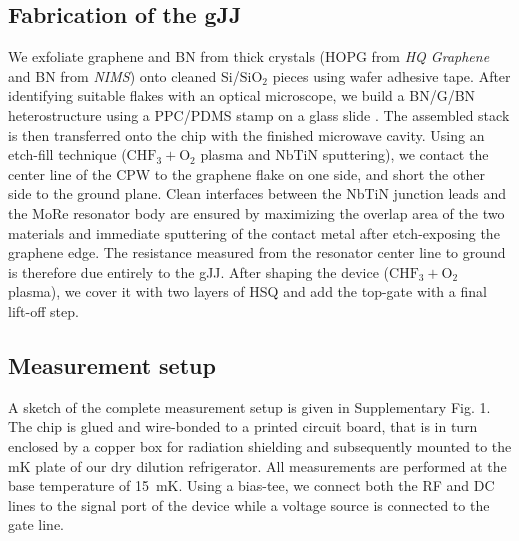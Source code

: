 \documentclass[preprint,
  onecolumn,
  notitlepage,
  amsmath,amssymb,
  aip,
  apl,
]{revtex4-1}
\begin{document}
\subsection*{Fabrication of the gJJ}
We exfoliate graphene and BN from thick crystals (HOPG from \textit{HQ Graphene} and BN from \textit{NIMS}\cite{taniguchi_synthesis_2007}) onto cleaned Si/$\mathrm{SiO_2}$ pieces using wafer adhesive tape.
After identifying suitable flakes with an optical microscope, we build a BN/G/BN heterostructure using a PPC/PDMS stamp on a glass slide \cite{pizzocchero_hot_2016,wang_onedimensional_2013}.
The assembled stack is then transferred onto the chip with the finished microwave cavity.
Using an etch-fill technique ($\mathrm{CHF_3 + O_2}$ plasma and NbTiN sputtering), we contact the center line of the CPW to the graphene flake on one side, and short the other side to the ground plane.
Clean interfaces between the NbTiN junction leads and the MoRe resonator body are ensured by maximizing the overlap area of the two materials and immediate sputtering of the contact metal after etch-exposing the graphene edge.
The resistance measured from the resonator center line to ground is therefore due entirely to the gJJ.
After shaping the device ($\mathrm{CHF_3 + O_2}$ plasma), we cover it with two layers of HSQ \cite{nanda_currentphase_2017} and add the top-gate with a final lift-off step.

\subsection*{Measurement setup}\label{sec:setup}
\noindent A sketch of the complete measurement setup is given in Supplementary Fig. 1.
The chip is glued and wire-bonded to a printed circuit board, that is in turn enclosed by a copper box for radiation shielding and subsequently mounted to the mK plate of our dry dilution refrigerator.
All measurements are performed at the base temperature of \SI{15}{mK}.
Using a bias-tee, we connect both the RF and DC lines to the signal port of the device while a voltage source is connected to the gate line.
\end{document}
